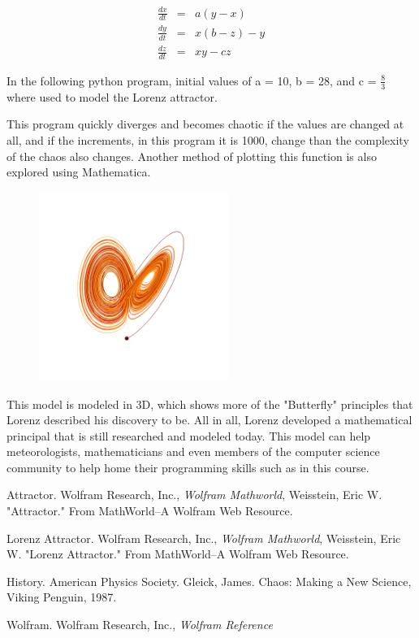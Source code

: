 \documentclass[10pt]{article}
\begin{document}
\begin{eqnarray}
	\frac{dx}{dt} & = & a(y-x) \\
	\frac{dy}{dt} & = & x(b-z)-y \\
	\frac{dz}{dt} & = & xy-cz
\end{eqnarray}

In the following python program, initial values of a = 10, b = 28, and c = $\frac{8}{3}$ where used to model the Lorenz attractor. 



This program quickly diverges and becomes chaotic if the values are changed at all, and if the increments, in this program it is 1000, change than the complexity of the chaos also changes. Another method of plotting this function is also explored using Mathematica. \cite{Mathematica}

\begin{figure}[h]
	\centering
	\includegraphics[width=0.55\textwidth]{include/mathematica_lorenz}
\end{figure}


This model is modeled in 3D, which shows more of the "Butterfly" principles that Lorenz described his discovery to be. All in all, Lorenz developed a mathematical principal that is still researched and modeled today. This model can help meteorologists, mathematicians and even members of the computer science community to help home their programming skills such as in this course. 


\begin{thebibliography}{9}

  Attractor.
  Wolfram Research, Inc.,
  \textit{Wolfram Mathworld},
  Weisstein, Eric W. "Attractor." From MathWorld--A Wolfram Web Resource.

 Lorenz Attractor.
 Wolfram Research, Inc.,
 \textit{Wolfram Mathworld},
 Weisstein, Eric W. "Lorenz Attractor." From MathWorld--A Wolfram Web Resource.

 History.
 American Physics Society.
 Gleick, James. Chaos: Making a New Science, Viking Penguin, 1987.

 Wolfram.
 Wolfram Research, Inc.,
 \textit{Wolfram Reference}

 \end{thebibliography}
\end{document}
